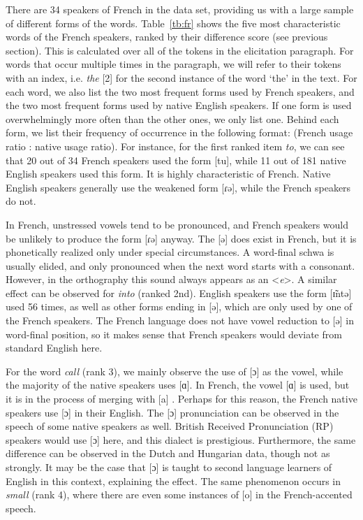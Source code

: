 \documentclass[output=paper]{LSP/langsci}
\begin{document}
There are 34 speakers of French in the data set, providing us with a large sample of different forms of the words. Table~\ref{tb:fr} shows the five most characteristic words of the French speakers, ranked by their difference score (see previous section). This is calculated over all of the tokens in the elicitation paragraph. For words that occur multiple times in the paragraph, we will refer to their tokens with an index, i.e. \textit{the} [2] for the second instance of the word `the' in the text. For each word, we also list the two most frequent forms used by French speakers, and the two most frequent forms used by native English speakers. If one form is used overwhelmingly more often than the other ones, we only list one. Behind each form, we list their frequency of occurrence in the following format: (French usage ratio : native usage ratio). For instance, for the first ranked item \textit{to}, we can see that 20 out of 34 French speakers used the form [tu], while 11 out of 181 native English speakers used this form. It is highly characteristic of French. Native English speakers generally use the weakened form [ɾə], while the French speakers do not. 

In French, unstressed vowels tend to be pronounced, and French speakers would be unlikely to produce the form [ɾə] anyway. The [ə] does exist in French, but it is phonetically realized only under special circumstances. A word-final schwa is usually elided, and only pronounced when the next word starts with a consonant. However, in the orthography this sound always appears as an <\textit{e}>. A similar effect can be observed for \textit{into} (ranked 2nd). English speakers use the form [ɪ̃ntə] used 56 times, as well as other forms ending in [ə], which are only used by one of the French speakers. The French language does not have vowel reduction to [ə] in word-final position, so it makes sense that French speakers would deviate from standard English here.

For the word \textit{call} (rank 3), we mainly observe the use of [ɔ] as the vowel, while the majority of the native speakers uses [ɑ]. In French, the vowel [ɑ] is used, but it is in the process of merging with [a] \citep[60--62]{walker_french_2001}. Perhaps for this reason, the French native speakers use [ɔ] in their English. The [ɔ] pronunciation can be observed in the speech of some native speakers as well. British Received Pronunciation (RP) speakers would use [ɔ] here, and this dialect is prestigious. Furthermore, the same difference can be observed in the Dutch and Hungarian data, though not as strongly. It may be the case that [ɔ] is taught to second language learners of English in this context, explaining the effect. The same phenomenon occurs in \textit{small} (rank 4), where there are even some instances of [o] in the French-accented speech.
\end{document}
